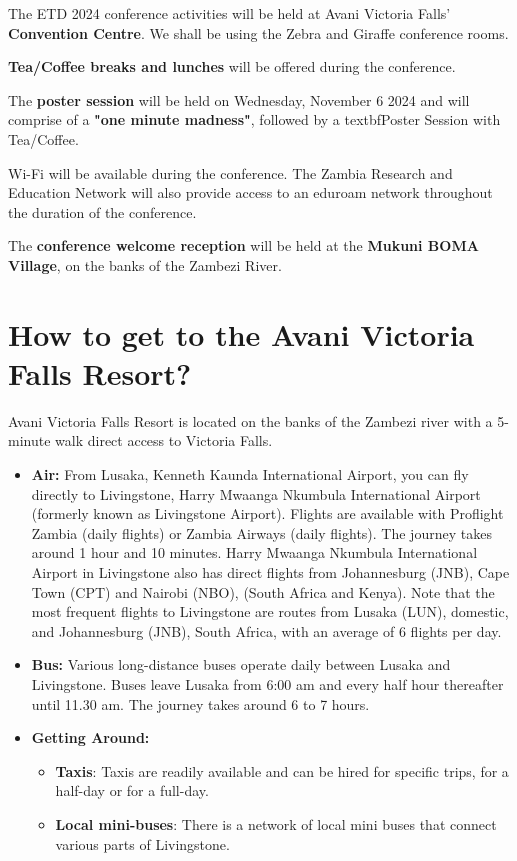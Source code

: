 The ETD 2024 conference activities will be held at Avani Victoria Falls' \textbf{Convention Centre}. We shall be using the Zebra and Giraffe conference rooms.

\textbf{Tea/Coffee breaks and lunches} will be offered during the conference.

The \textbf{poster session} will be held on Wednesday, November 6 2024 and will comprise of a \textbf{"one minute madness"}, followed by a textbf{Poster Session with Tea/Coffee}.

Wi-Fi will be available during the conference. The Zambia Research and Education Network will also provide access to an eduroam network throughout the duration of the conference.

The \textbf{conference welcome reception} will be held at the \textbf{Mukuni BOMA Village}, on the banks of the Zambezi River.

\section{How to get to the Avani Victoria Falls Resort?}

Avani Victoria Falls Resort is located on the banks of the Zambezi river with a 5-minute walk direct access to Victoria Falls.

\begin{itemize}

	\item \textbf{Air:} From Lusaka, Kenneth Kaunda International Airport, you can fly directly to Livingstone, Harry Mwaanga Nkumbula International Airport (formerly known as Livingstone Airport). Flights are available with Proflight Zambia (daily flights) or Zambia Airways (daily flights). The journey takes around 1 hour and 10 minutes. Harry Mwaanga Nkumbula International Airport in Livingstone also has direct flights from Johannesburg (JNB), Cape Town (CPT) and Nairobi (NBO), (South Africa and Kenya). Note that the most frequent flights to Livingstone are routes from Lusaka (LUN), domestic, and Johannesburg (JNB), South Africa, with an average of 6 flights per day.
	\item \textbf{Bus:} Various long-distance buses operate daily between Lusaka and Livingstone. Buses leave Lusaka from 6:00 am and every half hour thereafter until 11.30 am. The journey takes around 6 to 7 hours.
	\item \textbf{Getting Around:}
	\begin{itemize}
	    \item \textbf{Taxis}: Taxis are readily available and can be hired for specific trips, for a half-day or for a full-day.
        \item \textbf{Local mini-buses}: There is a network of local mini buses that connect various parts of Livingstone.
    \end{itemize}
	
\end{itemize}

